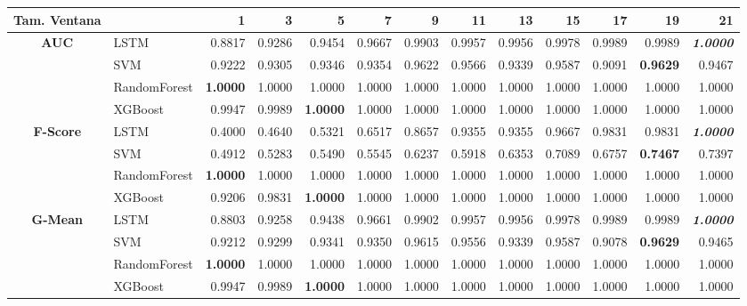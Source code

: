 \begin{table}[H]
\centering
\begin{adjustbox}{max width=12cm}
	\begin{tabular}{|c|l|r|r|r|r|r|r|r|r|r|r|r|}
		\hline
		\textbf{Tam. Ventana}&         &      1  &      3  &      5  &      7  &      9  &      11 &      13 &      15 &      17 &      19 &      21 \\
		\hline
		\textbf{AUC} &  LSTM &  0.8817 &  0.9286 &  0.9454 &  0.9667 &  0.9903 &  0.9957 &  0.9956 &  0.9978 &  0.9989 &  0.9989 & \textit{ \textbf{  1.0000 } } \\
		&  SVM &  0.9222 &  0.9305 &  0.9346 &  0.9354 &  0.9622 &  0.9566 &  0.9339 &  0.9587 &  0.9091 & \textbf{  0.9629 } &  0.9467 \\
		&  RandomForest & \textbf{  1.0000 } &  1.0000 &  1.0000 &  1.0000 &  1.0000 &  1.0000 &  1.0000 &  1.0000 &  1.0000 &  1.0000 &  1.0000 \\
		&  XGBoost &  0.9947 &  0.9989 & \textbf{  1.0000 } &  1.0000 &  1.0000 &  1.0000 &  1.0000 &  1.0000 &  1.0000 &  1.0000 &  1.0000 \\
		\hline
		\textbf{F-Score} &  LSTM &  0.4000 &  0.4640 &  0.5321 &  0.6517 &  0.8657 &  0.9355 &  0.9355 &  0.9667 &  0.9831 &  0.9831 & \textit{ \textbf{  1.0000 } } \\
		&  SVM &  0.4912 &  0.5283 &  0.5490 &  0.5545 &  0.6237 &  0.5918 &  0.6353 &  0.7089 &  0.6757 & \textbf{  0.7467 } &  0.7397 \\
		&  RandomForest & \textbf{  1.0000 } &  1.0000 &  1.0000 &  1.0000 &  1.0000 &  1.0000 &  1.0000 &  1.0000 &  1.0000 &  1.0000 &  1.0000 \\
		&  XGBoost &  0.9206 &  0.9831 & \textbf{  1.0000 } &  1.0000 &  1.0000 &  1.0000 &  1.0000 &  1.0000 &  1.0000 &  1.0000 &  1.0000 \\
		\hline
		\textbf{G-Mean} &  LSTM &  0.8803 &  0.9258 &  0.9438 &  0.9661 &  0.9902 &  0.9957 &  0.9956 &  0.9978 &  0.9989 &  0.9989 & \textit{ \textbf{  1.0000 } } \\
		&  SVM &  0.9212 &  0.9299 &  0.9341 &  0.9350 &  0.9615 &  0.9556 &  0.9339 &  0.9587 &  0.9078 & \textbf{  0.9629 } &  0.9465 \\
		&  RandomForest & \textbf{  1.0000 } &  1.0000 &  1.0000 &  1.0000 &  1.0000 &  1.0000 &  1.0000 &  1.0000 &  1.0000 &  1.0000 &  1.0000 \\
		&  XGBoost &  0.9947 &  0.9989 & \textbf{  1.0000 } &  1.0000 &  1.0000 &  1.0000 &  1.0000 &  1.0000 &  1.0000 &  1.0000 &  1.0000 \\

\end{tabular}
\end{adjustbox}
\end{table}
